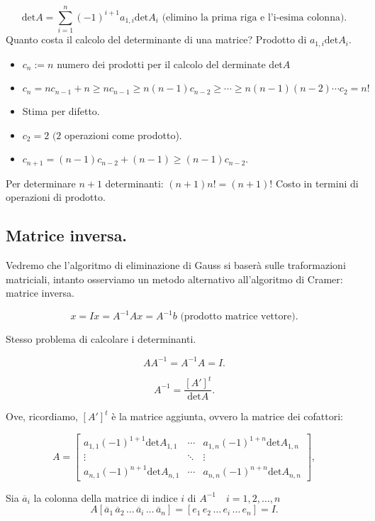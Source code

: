 \[\textrm{det}A = \sum_{i = 1}^{n}(-1)^{i+1}a_{1,i}\textrm{det}A_i
\textrm{ (elimino la prima riga e l'i-esima colonna).}\]
Quanto costa il calcolo del determinante di una matrice?
\newline
Prodotto di $a_{1,i}\textrm{det}A_i$.
\begin{itemize}
\item[]$c_n := n$ numero dei prodotti per il calcolo del derminate det$A$
\item[]$c_n = n c_{n -1} + n\geq n c_{n-1} \geq
n(n-1) c_{n-2} \geq \cdots \geq n(n-1)(n-2) \cdots c_2 = n!$
\item[]Stima per difetto.
\item[]$c_2 = 2$ $ (2$ operazioni come prodotto).
\item[]$c_{n+1} = (n-1)c_{n-2} + (n-1) \geq (n-1)c_{n-2}$.
\end{itemize}

Per determinare $n+1$ determinanti: $(n+1)n! = (n+1)!$
Costo in termini di operazioni di prodotto.

\subsection{Matrice inversa.}
Vedremo che l'algoritmo di eliminazione di Gauss si baserà sulle traformazioni
matriciali, intanto osserviamo un metodo alternativo all'algoritmo di Cramer:
matrice inversa.

\[x = Ix = A^{-1}Ax = A^{-1}b \textrm{ (prodotto matrice vettore).}\]

Stesso problema di calcolare i determinanti.

\[A A^{-1} = A^{-1} A = I.\]

\[A^{-1} = \frac{[A']^t}{\textrm{det}A}.\]

Ove, ricordiamo, $[A']^t$ è la matrice aggiunta, ovvero la matrice dei cofattori:

\[
A = \left[ \begin{array}{ccccc}
a_{1,1}(-1)^{1+1} \textrm{det}A_{1,1} & \cdots & a_{1,n}(-1)^{1+n} \textrm{det}A_{1,n} \\
\vdots & \ddots & \vdots \\
a_{n,1}(-1)^{n+1} \textrm{det}A_{n,1} & \cdots & a_{n,n}(-1)^{n+n} \textrm{det}A_{n,n}
\end{array} \right],
\]

Sia $\overline{a}_i$ la colonna della matrice di indice $i$ di
$A^{-1} \quad i = 1, 2, \ldots , n$
\[
A[\overline{a}_1\, \overline{a}_2\, \ldots\, \overline{a}_i\, \ldots\,
\overline{a}_n] = [e_1\, e_2\, \ldots\, e_i\, \ldots\, e_n] = I.\]

